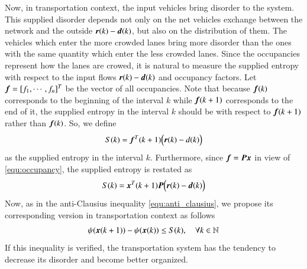 \documentclass[preprint,authoryear,12pt]{elsarticle}
\renewcommand{\vec}[1]{\mbox{\boldmath$#1$}}
\newcommand{\mat}[1]{\mbox{\boldmath$#1$}}
\begin{document}
Now, in transportation context, the input vehicles bring disorder to
the system. This supplied disorder depends not only on  the  net vehicles exchange between the network and the outside  $\vec{r}(k)-\vec{d}(k)$, but also on the distribution of them. The vehicles
which enter the more crowded lanes bring more disorder than the ones
with the same quantity which enter the less crowded lanes. Since the
occupancies represent how the lanes are crowed, it is natural to
measure the supplied entropy with respect to the input flows $\vec{r}(k)-\vec{d}(k)$ and 
occupancy factors. Let $\vec{f}=[f_1,\cdots,f_n]^T$ be the vector of
all occupancies. Note that because $\vec{f}(k)$ corresponds to the
beginning of the interval $k$ while $\vec{f}(k+1)$ corresponds to the
end of it, the supplied entropy in the interval $k$ should be with respect 
to $\vec{f}(k+1)$ rather than $\vec{f}(k)$. So, we define
$$S(k)=\vec{f}^T(k+1)\Bigl(\vec{r}(k)-d(k)\Bigr)$$
as the supplied entropy in the interval $k$. Furthermore, since
$\vec{f}=\mat{P}\vec{x}$ in view of \eqref{equ:occupancy}, the
supplied entropy is restated as
\begin{equation}\label{equ:supply}
    S(k)=\vec{x}^T(k+1) \mat{P} \Bigl(\vec{r}(k)-\vec{d}(k)\Bigr)
\end{equation}
Now, as in the anti-Clausius inequality \eqref{equ:anti_clausius}, we
propose its corresponding version in transportation context as
follows
\begin{equation}\label{equ:dissipative}
\psi(\vec{x}(k+1))-\psi(\vec{x}(k)) \leq S(k),\quad \forall
k\in\mathbb{N}
\end{equation}
If this inequality is verified, the transportation system has the
tendency to decrease its disorder and become better organized.
\end{document}
